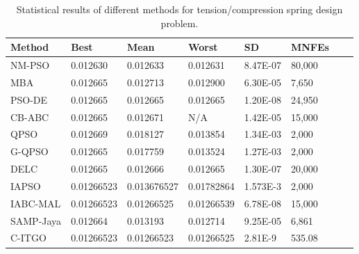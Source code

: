 
\begin{table*}[tp]
    \tiny
\begin{center}

\begin{tabular}{ P{2.0cm} P{2.0cm} P{2.0cm} P{2.0cm} P{2.0cm} P{2.0cm} P{2.0cm} P{2.0cm}  }
\hline
\textbf{Method} & \textbf{Best} & \textbf{Mean} & \textbf{Worst} & \textbf{SD} & \textbf{MNFEs} \\
\hline

NM-PSO & 0.012630 & 0.012633 & 0.012631 & 8.47E-07 & 80,000 \\
MBA & 0.012665 & 0.012713 & 0.012900 & 6.30E-05 & 7,650 \\
PSO-DE & 0.012665 & 0.012665 & 0.012665 & 1.20E-08 & 24,950 \\
CB-ABC & 0.012665 & 0.012671 & N/A & 1.42E-05 & 15,000 \\
QPSO & 0.012669 & 0.018127 & 0.013854 & 1.34E-03 & 2,000 \\
G-QPSO & 0.012665 & 0.017759 & 0.013524 & 1.27E-03 & 2,000 \\
DELC & 0.012665 & 0.012666 & 0.012665 & 1.30E-07 & 20,000 \\
IAPSO & 0.01266523 & 0.013676527 & 0.01782864 & 1.573E-3 & 2,000 \\
IABC-MAL & 0.01266523 & 0.01266525 & 0.01266539 & 6.78E-08 & 15,000 \\
SAMP-Jaya & 0.012664 & 0.013193 & 0.012714 & 9.25E-05 & 6,861 \\
C-ITGO & 0.01266523 & 0.01266523 & 0.01266525 & 2.81E-9 & 535.08 \\

\hline
\end{tabular}
\end{center}

\caption{ Statistical results of different methods for tension/compression spring design problem. \\[1em]}
\label{tab:TC}
\end{table*}

